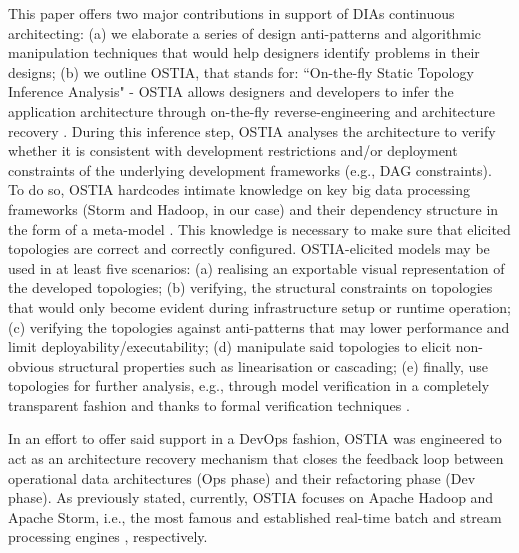 This paper offers two major contributions in support of DIAs continuous architecting: (a) we elaborate a series of design anti-patterns and algorithmic manipulation techniques that would help designers identify problems in their designs; (b) we outline OSTIA, that stands for: ``On-the-fly Static Topology Inference Analysis" - OSTIA allows designers and developers to infer the application architecture through on-the-fly reverse-engineering and architecture recovery \cite{archrec}. During this inference step, OSTIA analyses the architecture to verify whether it is consistent with development restrictions and/or deployment constraints of the underlying development frameworks (e.g., DAG constraints). To do so, OSTIA hardcodes intimate knowledge on key big data processing frameworks (Storm and Hadoop, in our case) and their dependency structure in the form of a meta-model \cite{mda}. This knowledge is necessary to make sure that elicited topologies are correct and correctly configured. OSTIA-elicited models may be used in at least five scenarios: (a) realising an exportable visual representation of the developed topologies; (b) verifying, the structural constraints on topologies that would only become evident during infrastructure setup or runtime operation; (c) verifying the topologies against anti-patterns \cite{patternoriented2000} that may lower performance and limit deployability/executability; (d) manipulate said topologies to elicit non-obvious structural properties such as linearisation or cascading; (e) finally, use topologies for further analysis, e.g., through model verification in a completely transparent fashion and thanks to formal verification techniques \cite{icsoft}. 

In an effort to offer said support in a DevOps fashion, OSTIA was engineered to act as an architecture recovery mechanism that closes the feedback loop between operational data architectures (Ops phase) and their refactoring phase (Dev phase). As previously stated, currently, OSTIA focuses on Apache Hadoop and Apache Storm, i.e., the most famous and established real-time batch and stream processing engines \cite{storm, toshniwal2014storm}, respectively. 

